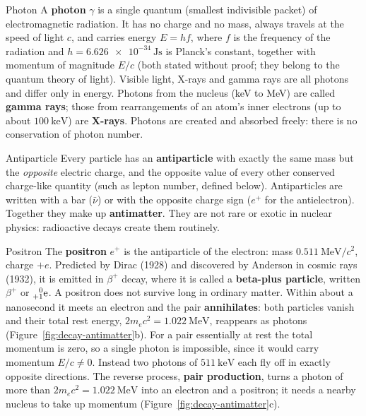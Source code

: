 \begin{defbox}{Photon}
A \textbf{photon} $\gamma$ is a single quantum (smallest indivisible packet) of electromagnetic radiation.
It has no charge and no mass, always travels at the speed of light $c$, and carries energy $E=hf$, where
$f$ is the frequency of the radiation and $h=\SI{6.626e-34}{\joule\second}$ is Planck's constant, together with
momentum of magnitude $E/c$ (both stated without proof; they belong to the quantum theory of light).
Visible light, X-rays and gamma rays are all photons and differ only in energy. Photons from the nucleus
(keV to MeV) are called \textbf{gamma rays}; those from rearrangements of an atom's inner electrons (up to
about $\SI{100}{\keV}$) are \textbf{X-rays}. Photons are created and absorbed freely: there is no
conservation of photon number.
\end{defbox}

\begin{defbox}{Antiparticle}
Every particle has an \textbf{antiparticle} with exactly the same mass but the \emph{opposite} electric
charge, and the opposite value of every other conserved charge-like quantity (such as lepton number,
defined below). Antiparticles are written with a bar ($\bar\nu$) or with the opposite charge sign ($e^+$
for the antielectron). Together they make up \textbf{antimatter}. They are not rare or exotic in nuclear
physics: radioactive decays create them routinely.
\end{defbox}

\begin{defbox}{Positron}
The \textbf{positron} $e^+$ is the antiparticle of the electron: mass $\SI{0.511}{\MeV}/c^2$, charge $+e$.
Predicted by Dirac (1928) and discovered by Anderson in cosmic rays (1932), it is emitted in $\beta^+$
decay, where it is called a \textbf{beta-plus particle}, written $\beta^+$ or $\prescript{0}{+1}{\mathrm{e}}$. A positron
does not survive long in ordinary matter. Within about a nanosecond it meets an electron and the pair
\textbf{annihilates}: both particles vanish and their total rest energy, $2m_ec^2=\SI{1.022}{\MeV}$,
reappears as photons (Figure~\ref{fig:decay-antimatter}b). For a pair essentially at rest the total momentum
is zero, so a single photon is impossible, since it would carry momentum $E/c\neq0$. Instead two photons
of $\SI{511}{\keV}$ each fly off in exactly opposite directions. The reverse process, \textbf{pair
production}, turns a photon of more than $2m_ec^2=\SI{1.022}{\MeV}$ into an electron and a positron; it
needs a nearby nucleus to take up momentum (Figure~\ref{fig:decay-antimatter}c).
\end{defbox}

